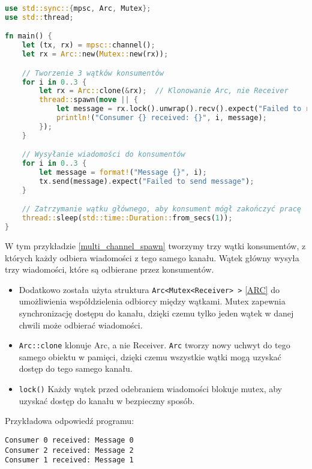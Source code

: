 \begin{lstlisting}[language=Rust, caption=Przykład z wieloma wątkami, label=multi_channel_spawn]
use std::sync::{mpsc, Arc, Mutex};
use std::thread;

fn main() {
    let (tx, rx) = mpsc::channel();
    let rx = Arc::new(Mutex::new(rx));

    // Tworzenie 3 wątków konsumentów
    for i in 0..3 {
        let rx = Arc::clone(&rx);  // Klonowanie Arc, nie Receiver
        thread::spawn(move || {
            let message = rx.lock().unwrap().recv().expect("Failed to receive message");
            println!("Consumer {} received: {}", i, message);
        });
    }

    // Wysyłanie wiadomości do konsumentów
    for i in 0..3 {
        let message = format!("Message {}", i);
        tx.send(message).expect("Failed to send message");
    }

    // Zatrzymanie wątku głównego, aby konsument mógł zakończyć pracę
    thread::sleep(std::time::Duration::from_secs(1));
}

\end{lstlisting}
W tym przykładzie \ref{multi_channel_spawn} tworzymy trzy wątki konsumentów, z których każdy odbiera wiadomości z tego samego kanału. Wątek główny wysyła trzy wiadomości, które są odbierane przez konsumentów.
\begin{itemize}
    \item Dodatkowo została użyta struktura \texttt{Arc<Mutex<Receiver> >} \ref{ARC} do umożliwienia współdzielenia odbiorcy między wątkami. Mutex zapewnia synchronizację dostępu do kanału, dzięki czemu tylko jeden wątek w danej chwili może odbierać wiadomości.
    \item \texttt{Arc::clone} klonuje Arc, a nie Receiver. \texttt{Arc} tworzy nowy uchwyt do tego samego obiektu w pamięci, dzięki czemu wszystkie wątki mogą uzyskać dostęp do tego samego kanału.
    \item \texttt{lock()} Każdy wątek przed odebraniem wiadomości blokuje mutex, aby uzyskać dostęp do kanału w bezpieczny sposób.
\end{itemize}
Przykładowa odpowiedź programu:
\begin{verbatim}
Consumer 0 received: Message 0
Consumer 2 received: Message 2
Consumer 1 received: Message 1
\end{verbatim}


